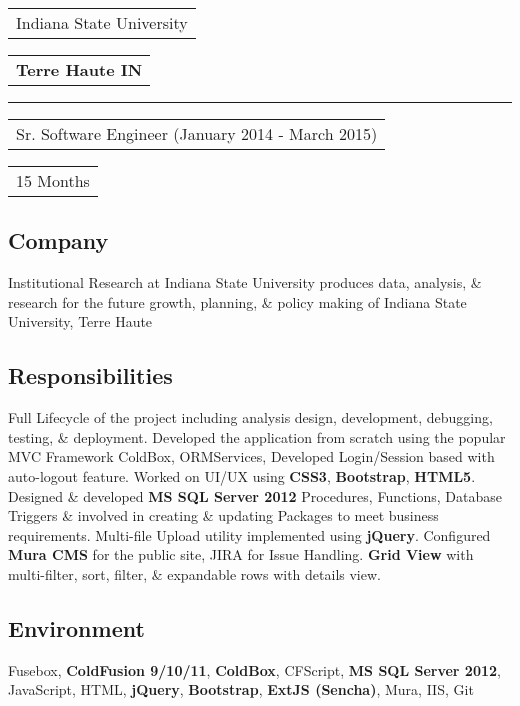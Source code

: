 \documentclass[letterpaper,11pt]{article}
\begin{document}
    \vspace{1.27cm}
    \noindent
    \begin{tabular}[t]{@{}l}
    \Large{Indiana State University}
    \end{tabular}
    \hfill
    \begin{tabular}[t]{l@{}}
    \textbf{Terre Haute IN}
    \end{tabular}
    \noindent\rule{\textwidth}{0.5pt}
    \begin{tabular}[t]{@{}l}
    Sr. Software Engineer (January 2014 - March 2015)
    \end{tabular}
    \hfill
    \begin{tabular}[t]{l@{}}
    15 Months
    \end{tabular}

    \subsection{Company}
    Institutional Research at Indiana State University produces data, analysis, \& research for the future growth, planning, \& policy making of Indiana State University, Terre Haute

    \subsection{Responsibilities}
    Full Lifecycle of the project including analysis design, development, debugging, testing, \& deployment. Developed the application from scratch using the popular MVC Framework ColdBox, ORMServices, Developed Login/Session based with auto-logout feature. Worked on UI/UX using \textbf{CSS3}, \textbf{Bootstrap}, \textbf{HTML5}. Designed \& developed \textbf{MS SQL Server 2012} Procedures, Functions, Database Triggers \& involved in creating \& updating Packages to meet business requirements. Multi-file Upload utility implemented using \textbf{jQuery}. Configured \textbf{Mura CMS} for the public site, JIRA for Issue Handling. \textbf{Grid View} with multi-filter, sort, filter, \& expandable rows with details view.

    \subsection{Environment}
    Fusebox, \textbf{ColdFusion 9/10/11}, \textbf{ColdBox}, CFScript, \textbf{MS SQL Server 2012}, JavaScript, HTML, \textbf{jQuery}, \textbf{Bootstrap}, \textbf{ExtJS (Sencha)}, Mura, IIS, Git
\end{document}
